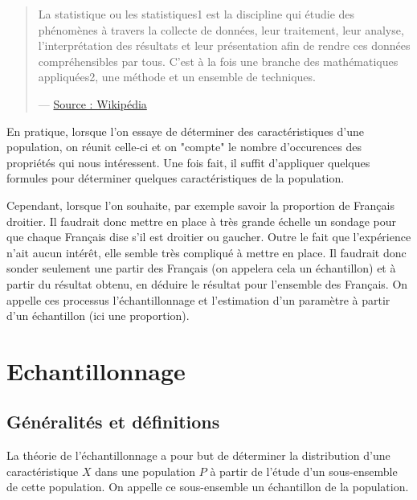 
\begin{quote}
    La statistique ou les statistiques1 est la discipline qui étudie des phénomènes à 
    travers la collecte de données, leur traitement, leur analyse, l'interprétation des 
    résultats et leur présentation afin de rendre ces données compréhensibles par tous. 
    C'est à la fois une branche des mathématiques appliquées2, une méthode et un ensemble de techniques. 

    \hfill --- \href{https://fr.wikipedia.org/wiki/Statistique}{Source : Wikipédia}
\end{quote}

En pratique, lorsque l'on essaye de déterminer des caractéristiques d'une population, 
on réunit celle-ci et on "compte" le nombre d'occurences des propriétés qui nous intéressent. 
Une fois fait, il suffit d'appliquer quelques formules pour déterminer quelques caractéristiques 
de la population. 

Cependant, lorsque l'on souhaite, par exemple savoir la proportion de Français droitier. Il faudrait donc 
mettre en place à très grande échelle un sondage pour que chaque Français dise s'il est droitier ou gaucher. 
Outre le fait que l'expérience n'ait aucun intérêt, elle semble très compliqué à mettre en place. 
Il faudrait donc sonder seulement une partir des Français (on appelera cela un échantillon) et à partir du 
résultat obtenu, en déduire le résultat pour l'ensemble des Français. On appelle ces processus l'échantillonnage 
et l'estimation d'un paramètre à partir d'un échantillon (ici une proportion). 


\section{Echantillonnage}

\subsection{Généralités et définitions}

La théorie de l'échantillonnage a pour but de déterminer la distribution d'une caractéristique $X$ dans une 
population $P$ à partir de l'étude d'un sous-ensemble de cette population. On appelle ce sous-ensemble un 
échantillon de la population. 

